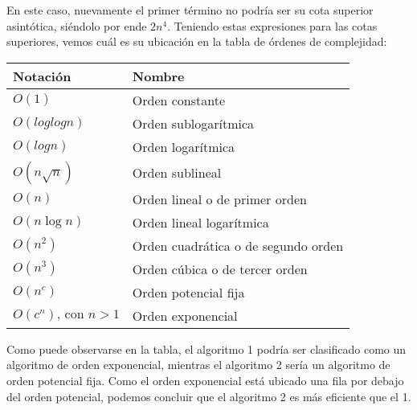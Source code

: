 En este caso, nuevamente el primer término no podría ser su cota superior asintótica, siéndolo por ende $2n^4$.
Teniendo estas expresiones para las cotas superiores, vemos cuál es su ubicación en la tabla de órdenes de complejidad:

\clearpage

\begin{table}[hbt!]
    \centering
    \begin{tabular}{ll}
        Notación                     & Nombre                              \\
        \hline
        $O(1)$                       & Orden constante                     \\
        $O(log log n)$               & Orden sublogarítmica                \\
        $O(log n)$                   & Orden logarítmica                   \\
        $O( n \sqrt{n})$             & Orden sublineal                     \\
        $O(n)$                       & Orden lineal o de primer orden      \\
        $O(n \log n)$                & Orden lineal logarítmica            \\
        $O(n^2)$                     & Orden cuadrática o de segundo orden \\
        $O(n^3)$                     & Orden cúbica o de tercer orden      \\
        $O(n^c)$                     & Orden potencial fija                \\
        $O(c^n) \text{, con } n > 1$ & Orden exponencial                   \\
        \hline
    \end{tabular}
\end{table}

Como puede observarse en la tabla, el algoritmo 1 podría ser clasificado como un algoritmo de orden exponencial, mientras el algoritmo 2 sería un algoritmo
de orden potencial fija. Como el orden exponencial está ubicado una fila por debajo del orden potencial, podemos concluir que el algoritmo 2 es más eficiente
que el 1.